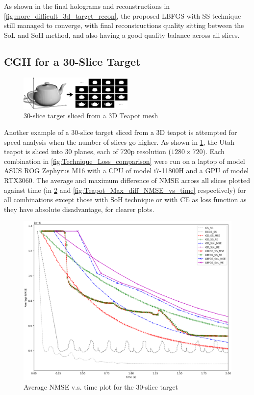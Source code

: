 As shown in the final holograms and reconstructions in \cref{fig:more_difficult_3d_target_recon}, the proposed LBFGS with SS technique still managed to converge, with final reconstructions quality sitting between the SoL and SoH method, and also having a good quality balance across all slices.



\newpage
\subsection{CGH for a 30-Slice Target} \label{sec:30-slice-target}

\begin{figure}[h!]
	\centering
	\includegraphics[width=0.5\textwidth]{Utah_teapot_target}
	\caption{30-slice target sliced from a 3D Teapot mesh}
	\label{fig:Teapot_target}
\end{figure}

Another example of a 30-slice target sliced from a 3D teapot is attempted for speed analysis when the number of slices go higher. As shown in \cref{fig:Teapot_target}, the Utah teapot \cite{Clark2015} is sliced into 30 planes, each of 720p resolution ($1280\times720$). Each combination in \cref{fig:Technique_Loss_comparison} were run on a laptop of model ASUS ROG Zephyrus M16 with a CPU of model i7-11800H and a GPU of model RTX3060. The average and maximum difference of NMSE across all slices plotted against time (in \cref{fig:Teapot_Average_NMSE_vs_time} and \cref{fig:Teapot_Max_diff_NMSE_vs_time} respectively) for all combinations except those with SoH technique or with CE as loss function as they have absolute disadvantage, for clearer plots.

\begin{figure}[h!]
	\centering
	\includegraphics[width=1.0\textwidth]{Teapot_Average_NMSE_vs_time}
	\caption{Average NMSE v.s. time plot for the 30-slice target}
	\label{fig:Teapot_Average_NMSE_vs_time}
\end{figure}

